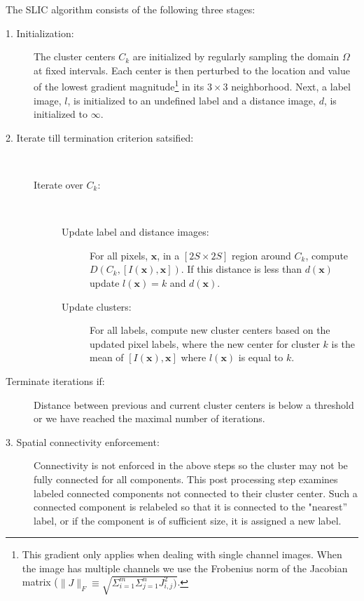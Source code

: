 \documentclass{InsightArticle}
\begin{document}
The SLIC algorithm consists of the following three stages:

\begin{description}
\item[1. Initialization:] The cluster centers $C_k$ are initialized by
regularly sampling the domain $\Omega$ at fixed intervals. Each center
is then perturbed to the location and value of the lowest gradient
magnitude\footnote{This gradient only applies when dealing with single
channel images. When the image has multiple channels we use the Frobenius
norm of the Jacobian matrix ($\|J\|_F \equiv \sqrt{\Sigma_{i=1}^m\Sigma_{j=1}^nJ_{i,j}^2)} $.} in its $3 \times 3$ neighborhood. Next, a label image, $l$, is
initialized to an undefined label and a distance image, $d$, is
initialized to $\infty$.

\item[2. Iterate till termination criterion satsified:] \hfill  \\[-4mm]

\begin{description}

\item[Iterate over $C_k$:] \hfill  \\[-4mm]

\begin{description}
\item[Update label and distance images:]  For all pixels, $\mathbf{x}$, in a $[2S \times 2S]$ region around
$C_k$, compute  $D(C_k, [I(\mathbf{x}),\mathbf{x}])$. If this distance is less than $d(\mathbf{x})$ 
update $l(\mathbf{x})=k$ and $d(\mathbf{x})$.

\item[Update clusters:] For all labels, compute new cluster centers based on the
updated pixel labels, where the new center for cluster $k$  is the mean of $[I(\mathbf{x}),\mathbf{x}]$
where $l(\mathbf{x})$ is equal to $k$.

\end{description}


\end{description}

\item[Terminate iterations if:] Distance between previous and current cluster centers is below a threshold or
we have reached the maximal number of iterations.

\item[3. Spatial connectivity enforcement:] Connectivity is not enforced in the
above steps so the cluster may not be fully connected for all
components. This post processing step examines labeled connected
components not connected to their cluster center.  Such a connected component is relabeled
so that it is connected to the "nearest'' label, or if the component is
of sufficient size, it is assigned a new label.
\end{description}
\end{document}
